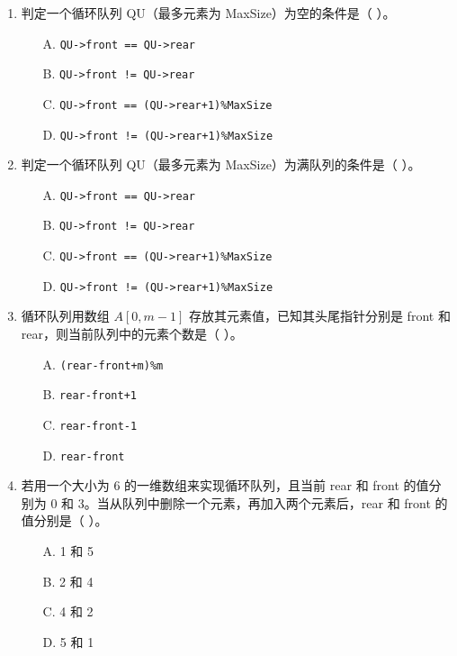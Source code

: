 \documentclass[12pt, a4paper]{article}
\begin{document}
\begin{enumerate}
    \item 判定一个循环队列 QU（最多元素为 MaxSize）为空的条件是（ ）。
    \begin{enumerate}
        \item[A.] \texttt{QU->front == QU->rear}
        \item[B.] \texttt{QU->front != QU->rear}
        \item[C.] \texttt{QU->front == (QU->rear+1)\%MaxSize}
        \item[D.] \texttt{QU->front != (QU->rear+1)\%MaxSize}
    \end{enumerate}
    
    \item 判定一个循环队列 QU（最多元素为 MaxSize）为满队列的条件是（ ）。
    \begin{enumerate}
        \item[A.] \texttt{QU->front == QU->rear}
        \item[B.] \texttt{QU->front != QU->rear}
        \item[C.] \texttt{QU->front == (QU->rear+1)\%MaxSize}
        \item[D.] \texttt{QU->front != (QU->rear+1)\%MaxSize}
    \end{enumerate}
    
    \item 循环队列用数组 $A[0, m-1]$ 存放其元素值，已知其头尾指针分别是 front 和 rear，则当前队列中的元素个数是（ ）。
    \begin{enumerate}
        \item[A.] \texttt{(rear-front+m)\%m}
        \item[B.] \texttt{rear-front+1}
        \item[C.] \texttt{rear-front-1}
        \item[D.] \texttt{rear-front}
    \end{enumerate}
    
    \item 若用一个大小为 6 的一维数组来实现循环队列，且当前 rear 和 front 的值分别为 0 和 3。当从队列中删除一个元素，再加入两个元素后，rear 和 front 的值分别是（ ）。
    \begin{enumerate}
        \item[A.] 1 和 5
        \item[B.] 2 和 4
        \item[C.] 4 和 2
        \item[D.] 5 和 1
    \end{enumerate}
    

\end{enumerate}
\end{document}
